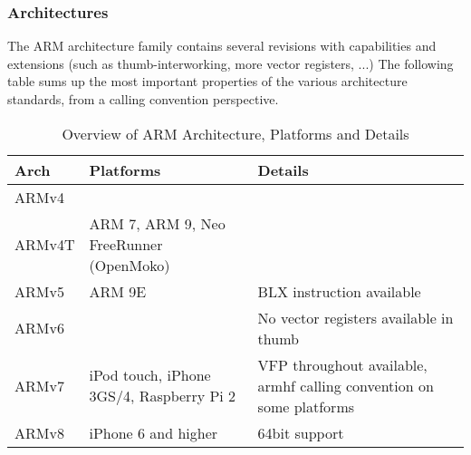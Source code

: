 \subsubsection{Architectures}

The ARM architecture family contains several revisions with capabilities and
extensions (such as thumb-interworking, more vector registers, ...) 
The following table sums up the most important properties of the various 
architecture standards, from a calling convention perspective.


\begin{table}[h]
\begin{tabular}{lll}
Arch   & Platforms & Details \\
\hline
ARMv4  & & \\
\hline
ARMv4T & ARM 7, ARM 9, Neo FreeRunner (OpenMoko) & \\
\hline
ARMv5  & ARM 9E & BLX instruction available \\
\hline
ARMv6  & & No vector registers available in thumb \\
\hline
ARMv7  & iPod touch, iPhone 3GS/4, Raspberry Pi 2 & VFP throughout available, armhf calling convention on some platforms \\ 
\hline
ARMv8  & iPhone 6 and higher & 64bit support \\ 
\hline
\end{tabular}
\caption{Overview of ARM Architecture, Platforms and Details}
\end{table}

\newpage

